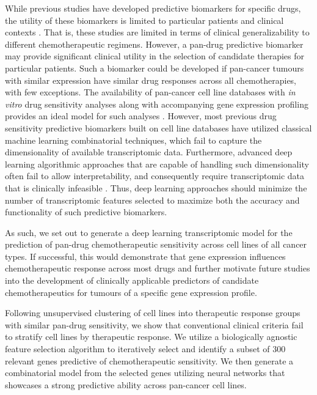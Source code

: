 \documentclass[10pt, letterpaper]{article}
\begin{document}
\begin{multicols*}{2}
While previous studies have developed predictive biomarkers for specific drugs, the utility of these biomarkers is limited to particular patients and clinical contexts \cite{drug_sense}. That is, these studies are limited in terms of clinical generalizability to different chemotherapeutic regimens. However, a pan-drug predictive biomarker may provide significant clinical utility in the selection of candidate therapies for particular patients. Such a biomarker could be developed if pan-cancer tumours with similar expression have similar drug responses across all chemotherapies, with few exceptions. The availability of pan-cancer cell line databases with \textit{in vitro} drug sensitivity analyses along with accompanying gene expression profiling provides an ideal model for such analyses \cite{gdsc}. However, most previous drug sensitivity predictive biomarkers built on cell line databases have utilized classical machine learning combinatorial techniques, which fail to capture the dimensionality of available transcriptomic data. Furthermore, advanced deep learning algorithmic approaches that are capable of handling such dimensionality often fail to allow interpretability, and consequently require transcriptomic data that is clinically infeasible \cite{ml_oncol}. Thus, deep learning approaches should minimize the number of transcriptomic features selected to maximize both the accuracy and functionality of such predictive biomarkers.

As such, we set out to generate a deep learning transcriptomic model for the prediction of pan-drug chemotherapeutic sensitivity across cell lines of all cancer types. If successful, this would demonstrate that gene expression influences chemotherapeutic response across most drugs and further motivate future studies into the development of clinically applicable predictors of candidate chemotherapeutics for tumours of a specific gene expression profile.

Following unsupervised clustering of cell lines into therapeutic response groups with similar pan-drug sensitivity, we show that conventional clinical criteria fail to stratify cell lines by therapeutic response. We utilize a biologically agnostic feature selection algorithm to iteratively select and identify a subset of 300 relevant genes predictive of chemotherapeutic sensitivity. We then generate a combinatorial model from the selected genes utilizing neural networks that showcases a strong predictive ability across pan-cancer cell lines.



\end{multicols*}
\end{document}
